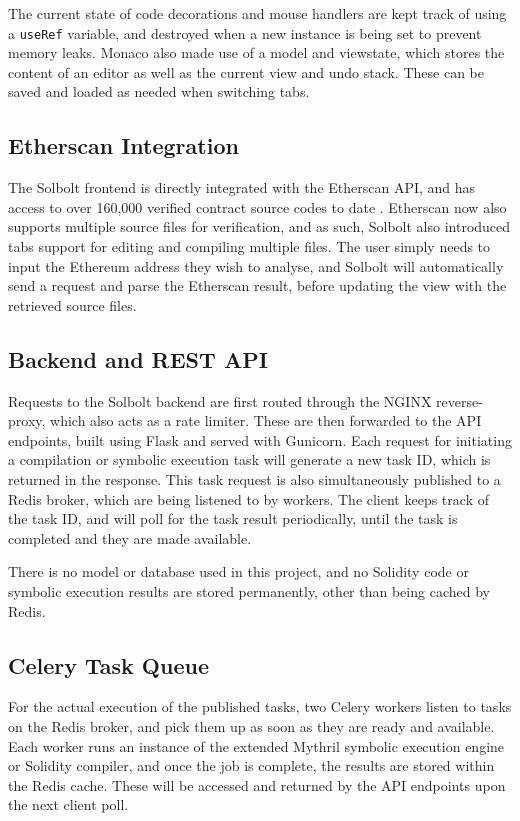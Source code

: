 The current state 
of code decorations and mouse handlers are kept track of using a \texttt{useRef} variable,
and destroyed when a new instance is being set to prevent memory leaks.
Monaco also made use of a 
model and viewstate, which stores the content of an editor as well as the current view and undo
stack. These can be saved and loaded as needed when switching tabs.

\subsection{Etherscan Integration}

The Solbolt frontend is directly integrated with the Etherscan API, and has access to over 160,000
verified contract source codes to date \cite{smart_contract_sanctuary}. Etherscan now also 
supports multiple source files for verification, and as such, Solbolt also introduced tabs support
for editing and compiling multiple files. The user simply needs to input the Ethereum address they
wish to analyse, and Solbolt will automatically send a request and parse the Etherscan result, before
updating the view with the retrieved source files.

\subsection{Backend and REST API}
Requests to the Solbolt backend are first routed through the NGINX reverse-proxy, which also
acts as a rate limiter. These are then forwarded to the API endpoints, built using Flask and
served with Gunicorn. Each request for initiating a compilation or symbolic execution task will generate a
new task ID, which is returned in the response. This task request is also simultaneously
published to a Redis broker, which are being listened to by workers. The client keeps track
of the task ID, and will poll for the task result periodically, until the task is completed
and they are made available.

There is no model or database used in this project, and no Solidity code or symbolic execution results
are stored permanently, other than being cached by Redis.

\subsection{Celery Task Queue}

For the actual execution of the published tasks, two Celery workers listen to tasks 
on the Redis broker, and pick them up as soon as they are ready and available. Each worker runs
an instance of the extended Mythril symbolic execution engine or Solidity compiler, and once 
the job is complete, the results are stored within the Redis cache. These will be accessed
and returned by the API endpoints upon the next client poll.

